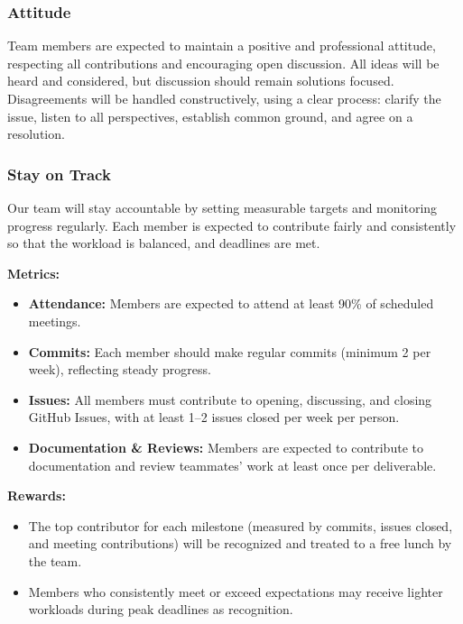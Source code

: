 \documentclass{article}
\begin{document}
\subsubsection*{Attitude}

Team members are expected to maintain a positive and professional attitude, respecting all contributions and encouraging open discussion. All ideas will be heard and considered, but discussion should remain solutions focused. Disagreements will be handled constructively, using a clear process: clarify the issue, listen to all perspectives, establish common ground, and agree on a resolution.

\subsubsection*{Stay on Track}

Our team will stay accountable by setting measurable targets and monitoring progress regularly. Each member is expected to contribute fairly and consistently so that the workload is balanced, and deadlines are met.

\vspace{0.5em}
\noindent\textbf{Metrics:}
\begin{itemize}
    \item \textbf{Attendance:} Members are expected to attend at least 90\% of scheduled meetings.
    \item \textbf{Commits:} Each member should make regular commits (minimum 2 per week), reflecting steady progress.
    \item \textbf{Issues:} All members must contribute to opening, discussing, and closing GitHub Issues, with at least 1--2 issues closed per week per person.
    \item \textbf{Documentation \& Reviews:} Members are expected to contribute to documentation and review teammates’ work at least once per deliverable.
\end{itemize}

\vspace{0.5em}
\noindent\textbf{Rewards:}
\begin{itemize}
    \item The top contributor for each milestone (measured by commits, issues closed, and meeting contributions) will be recognized and treated to a free lunch by the team.
    \item Members who consistently meet or exceed expectations may receive lighter workloads during peak deadlines as recognition.
\end{itemize}
\end{document}
